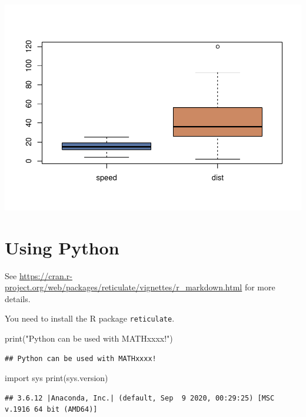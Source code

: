 \documentclass[mstat,12pt]{unswthesis}
\newenvironment{Shaded}{\begin{snugshade}}{\end{snugshade}}
\newcommand{\BuiltInTok}[1]{#1}
\newcommand{\ImportTok}[1]{#1}
\newcommand{\NormalTok}[1]{#1}
\newcommand{\StringTok}[1]{\textcolor[rgb]{0.31,0.60,0.02}{#1}}
\begin{document}
\includegraphics{unsw-ZZSC9020-report-template_files/figure-latex/unnamed-chunk-1-1.pdf}

\hypertarget{using-python}{%
\section{Using Python}\label{using-python}}

See
\url{https://cran.r-project.org/web/packages/reticulate/vignettes/r_markdown.html}
for more details.

\bigskip

You need to install the R package \texttt{reticulate}.

\begin{Shaded}
\begin{Highlighting}[]
\BuiltInTok{print}\NormalTok{(}\StringTok{"Python can be used with MATHxxxx!"}\NormalTok{)}
\end{Highlighting}
\end{Shaded}

\begin{verbatim}
## Python can be used with MATHxxxx!
\end{verbatim}

\begin{Shaded}
\begin{Highlighting}[]
\ImportTok{import}\NormalTok{ sys}
\BuiltInTok{print}\NormalTok{(sys.version)}
\end{Highlighting}
\end{Shaded}

\begin{verbatim}
## 3.6.12 |Anaconda, Inc.| (default, Sep  9 2020, 00:29:25) [MSC v.1916 64 bit (AMD64)]
\end{verbatim}
\end{document}
